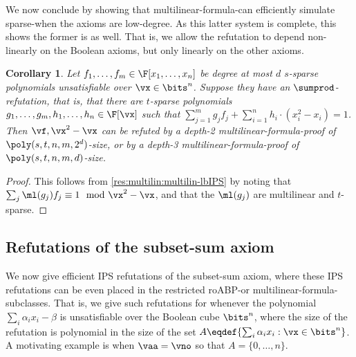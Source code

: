\documentclass[11pt]{article}
\numberwithin{equation}{section}
\newtheorem{corollary}[theorem]{Corollary}
\theoremstyle{definition}
\theoremstyle{plain}
\begin{document}
We now conclude by showing that multilinear-formula-\lbIPS can efficiently simulate sparse-\lIPS when the axioms are low-degree. As this latter system is complete, this shows the former is as well. That is, we allow the refutation to depend non-linearly on the Boolean axioms, but only linearly on the other axioms.

\begin{corollary}\label{res:multilin:simulate-sparse}
        Let $f_1,\ldots,f_m\in\F[x_1,\ldots,x_n]$ be degree at most $d$ $s$-sparse polynomials unsatisfiable over $\vx\in\bits^n$.  Suppose they have an $\sumprod$-\lIPS refutation, that is, that there are $t$-sparse polynomials $g_1,\ldots,g_m,h_1,\ldots,h_n\in\F[\vx]$ such that $\sum_{j=1}^m g_j f_j+\sum_{i=1}^n h_i \cdot (x_i^2-x_i)=1$.  Then $\vf,\vx^2-\vx$ can be refuted by a depth-2 multilinear-formula-\lbIPS proof of $\poly(s,t,n,m,2^d)$-size, or by a depth-3 multilinear-formula-\lbIPS proof of $\poly(s,t,n,m,d)$-size.
\end{corollary}
\begin{proof}
        This follows from \autoref{res:multilin:multilin-lbIPS} by noting that $\sum_j \ml(g_j)f_j\equiv 1\mod \vx^2-\vx$, and that the $\ml(g_j)$ are multilinear and $t$-sparse.
\end{proof}

\subsection{Refutations of the subset-sum axiom}\label{sec:subset:ub}

We now give efficient IPS refutations of the subset-sum axiom, where these IPS refutations can be even placed in the restricted roABP-\lIPS or multilinear-formula-\lIPS subclasses.  That is, we give such refutations for whenever the polynomial $\sum_i \alpha_ix_i-\beta$ is unsatisfiable over the Boolean cube $\bits^n$, where the size of the refutation is polynomial in the size of the set $A\eqdef\{\sum_i \alpha_ix_i: \vx\in\bits^n\}$.  A motivating example is when $\vaa=\vno$ so that $A=\{0,\ldots,n\}$.
\end{document}
